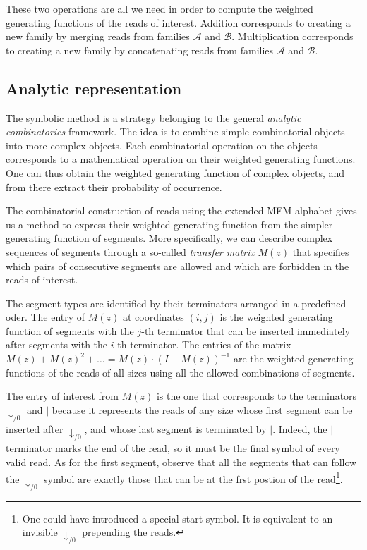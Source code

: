 \documentclass{article}
\begin{document}
These two operations are all we need in order to compute the weighted
generating functions of the reads of interest. Addition corresponds to
creating a new family by merging reads from families $\mathcal{A}$ and
$\mathcal{B}$. Multiplication corresponds to creating a new family by
concatenating reads from families $\mathcal{A}$ and $\mathcal{B}$.

\subsection{Analytic representation}

The symbolic method is a strategy belonging to the general \emph{analytic
combinatorics} framework. The idea is to combine simple combinatorial
objects into more complex objects. Each combinatorial operation on the
objects corresponds to a mathematical operation on their weighted
generating functions. One can thus obtain the weighted generating function
of complex objects, and from there extract their probability of
occurrence.

The combinatorial construction of reads using the extended MEM alphabet
gives us a method to express their weighted generating function from the
simpler generating function of segments. More specifically, we can
describe complex sequences of segments through a so-called \emph{transfer
matrix} $M(z)$ that specifies which pairs of consecutive segments are
allowed and which are forbidden in the reads of interest.

The segment types are identified by their terminators arranged in a
predefined oder. The entry of $M(z)$ at coordinates $(i,j)$ is the
weighted generating function of segments with the $j$-th terminator that
can be inserted immediately after segments with the $i$-th terminator. The
entries of the matrix $M(z) + M(z)^2 + \ldots = M(z) \cdot (I-M(z))^{-1}$
are the weighted generating functions of the reads of all sizes using all
the allowed combinations of segments.

The entry of interest from $M(z)$ is the one that corresponds to the
terminators $\downarrow_{/0}$ and $|$ because it represents the reads of
any size whose first segment can be inserted after $\downarrow_{/0}$, and
whose last segment is terminated by $|$. Indeed, the $|$ terminator marks
the end of the read, so it must be the final symbol of every valid read.
As for the first segment, observe that all the segments that can follow
the $\downarrow_{/0}$ symbol are exactly those that can be at the frst
postion of the read\footnote{One could have introduced a special start
symbol. It is equivalent to an invisible $\downarrow_{/0}$ prepending
the reads.}.
\end{document}
